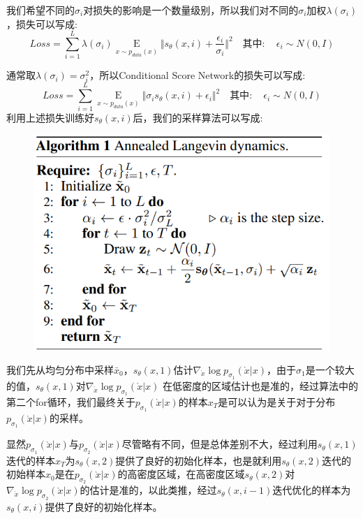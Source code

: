 \documentclass[withoutpreface,bwprint]{cumcmthesis} %
\begin{document}
	我们希望不同的$\sigma_{i}$对损失的影响是一个数量级别，所以我们对不同的$\sigma_{i}$加权$\lambda(\sigma_{i})$，损失可以写成:
	$$
		Loss =   \sum_{i=1}^{L} \lambda(\sigma_{i}) \mathop{E}\limits_{ x \sim p_{data}(x) }  \Vert s_{\theta}(x,i) + \dfrac{\epsilon_i}{\sigma_{i}}  \Vert^2  \quad \textbf{其中}: \quad \epsilon_i \sim N(0,I) 
	$$
	
	通常取$\lambda(\sigma_{i})=\sigma_{i}^2$，所以Conditional Score Network的损失可以写成:
	$$
			Loss =   \sum_{i=1}^{L}  \mathop{E}\limits_{ x \sim p_{data}(x) }  \Vert \sigma_{i} s_{\theta}(x,i) + \epsilon_i  \Vert^2  \quad \textbf{其中}: \quad \epsilon_i \sim N(0,I) 
	$$
	利用上述损失训练好$s_{\theta}(x,i)$后，我们的采样算法可以写成:
	\begin{figure}[htbp]
		\centering
		\includegraphics[scale=0.8]{算法1.png}
	\end{figure}

	我们先从均匀分布中采样$\bar{x}_0$，$s_{\theta}(x,1)$估计$\nabla_{\grave{x}} \log p_{\sigma_1}(\grave{x}|x)$，由于$\sigma_{1}$是一个较大的值，$s_{\theta}(x,1)$对$\nabla_{\grave{x}} \log p_{\sigma_1}(\grave{x}|x)$ 在低密度的区域估计也是准的，经过算法中的第二个for循环，我们最终关于$p_{\sigma_{1}}(\grave{x}|x)$的样本$x_T$是可以认为是关于对于分布$p_{\sigma_{1}}(\grave{x}|x)$的采样。
	
	显然$p_{\sigma_1}(\grave{x}|x)$与$p_{\sigma_2}(\grave{x}|x)$尽管略有不同，但是总体差别不大，经过利用$s_{\theta}(x,1)$迭代的样本$x_T$为$s_{\theta}(x,2)$提供了良好的初始化样本，也是就利用$s_{\theta}(x,2)$迭代的初始样本$x_0$是在$p_{\sigma_2}(\grave{x}|x)$的高密度区域，在高密度区域$s_{\theta}(x,2)$对$\nabla_{\grave{x}} \log p_{\sigma_2}(\grave{x}|x)$的估计是准的，以此类推，经过$s_{\theta}(x,i-1)$迭代优化的样本为$s_{\theta}(x,i)$提供了良好的初始化样本。
	
\end{document}
